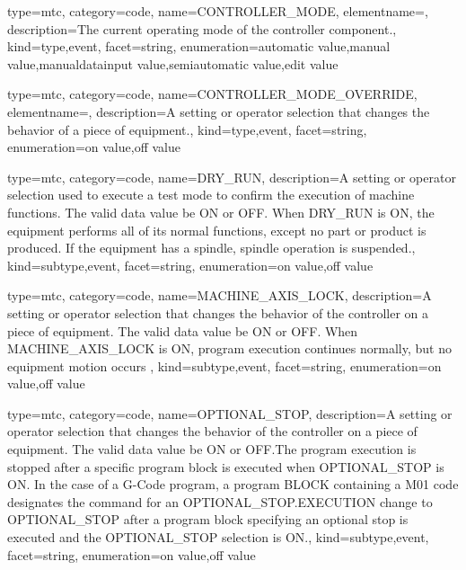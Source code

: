 {
  type=mtc,
  category=code,
  name={CONTROLLER\_MODE},
  elementname=,
  description={The current operating mode of the \gls{controller} component.},
  kind={type,event},
  facet={\gls{string}},
  enumeration={\gls{automatic value},\gls{manual value},\gls{manualdatainput value},\gls{semiautomatic value},\gls{edit value}}
}


{
  type=mtc,
  category=code,
  name={CONTROLLER\_MODE\_OVERRIDE},
  elementname=,
  description={A setting or operator selection that changes the behavior of a piece of equipment.},
  kind={type,event},
  facet={\gls{string}},
  enumeration={\gls{on value},\gls{off value}}
}


{
  type=mtc,
  category=code,
  name={DRY\_RUN},
  description={A setting or operator selection used to execute a test mode to confirm the execution of machine functions.  The \gls{valid data value} \must be ON or OFF. \newline When DRY\_RUN is ON, the equipment performs all of its normal functions, except no part or product is produced.  If the equipment has a spindle, spindle operation is suspended.},
  kind={subtype,event},
  facet={\gls{string}},
  enumeration={\gls{on value},\gls{off value}}
}


{
  type=mtc,
  category=code,
  name={MACHINE\_AXIS\_LOCK},
  description={A setting or operator selection that changes the behavior of the controller on a piece of equipment.  The \gls{valid data value} \must be ON or OFF. \newline When MACHINE\_AXIS\_LOCK is ON, program execution continues normally, but no equipment motion occurs },
  kind={subtype,event},
  facet={\gls{string}},
  enumeration={\gls{on value},\gls{off value}}
}


{
  type=mtc,
  category=code,
  name={OPTIONAL\_STOP},
  description={A setting or operator selection that changes the behavior of the controller on a piece of equipment.  The \gls{valid data value} \must be ON or OFF.The program execution is stopped after a specific program block is executed when OPTIONAL\_STOP is ON.    \newline In the case of a G-Code program, a program BLOCK containing a M01 code designates the command for an OPTIONAL\_STOP.EXECUTION \must change to OPTIONAL\_STOP after a program block specifying an optional stop is executed and the OPTIONAL\_STOP selection is ON.},
  kind={subtype,event},
  facet={\gls{string}},
  enumeration={\gls{on value},\gls{off value}}
}


